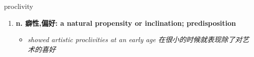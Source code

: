 
\begin{frame}
{\huge proclivity}
\begin{center}
\begin{enumerate}\Large
  \item \textbf{n. 癖性,偏好: a natural propensity or inclination; predisposition}
  \begin{itemize}
    \item \em{\Large{showed artistic proclivities at an early age 在很小的时候就表现除了对艺术的喜好}}
  \end{itemize}
\end{enumerate}
\end{center}
\end{frame}
